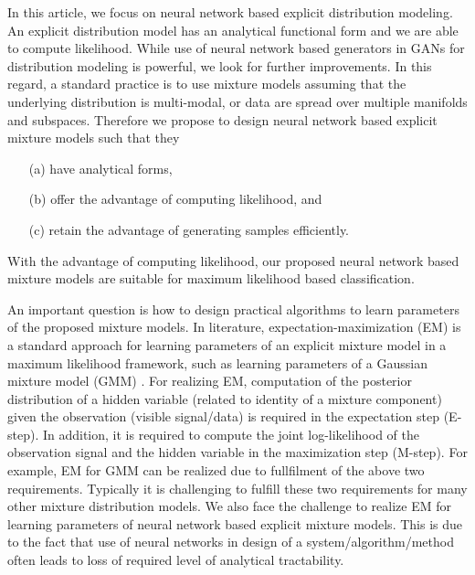 
In this article, we focus on neural network based explicit distribution modeling. An explicit distribution model has an analytical functional form and we are able to compute likelihood. While use of neural network based generators in GANs for distribution modeling is powerful, we look for further improvements. In this regard, a standard practice is to use mixture models assuming that the underlying distribution is multi-modal, or data are spread over multiple manifolds and subspaces. Therefore we propose to design neural network based explicit mixture models such that they
\begin{enumerate}
\item[(a)] have analytical forms, 
\item[(b)] offer the advantage of computing likelihood, and 
\item[(c)] retain the advantage of generating samples efficiently.
\end{enumerate}
With the advantage of computing likelihood, our proposed neural network based mixture models are suitable for maximum likelihood based classification. 

An important question is how to design practical algorithms to learn parameters of the proposed mixture models. In literature, expectation-maximization (EM) \cite{dempster1977maximum} is a standard approach for learning parameters of an explicit mixture model in a maximum likelihood framework, such as learning parameters of a Gaussian mixture model (GMM) \cite{Bishop:2006:PRM:1162264}. For realizing EM, computation of the
posterior distribution of a hidden variable (related to identity of a mixture component) given the observation
(visible signal/data) is required in the expectation step
(E-step). In addition, it is required to compute the joint log-likelihood of the observation signal and the hidden variable in the maximization step (M-step). For example, EM for GMM can be realized due to fullfilment of the above two requirements. Typically it is challenging to fulfill these two requirements for many other mixture distribution models. We also face the challenge to realize EM for learning parameters of neural network based explicit mixture models. This is due to the fact that use of neural networks in design of a system/algorithm/method often leads to loss of required level of analytical tractability. 


